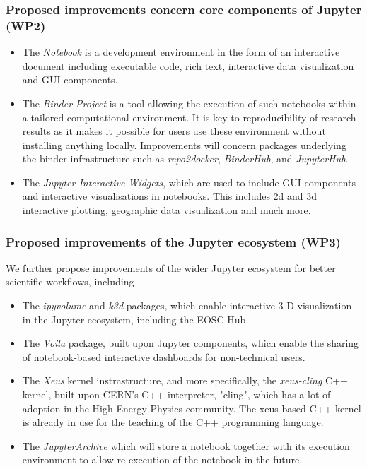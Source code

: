 \subsubsection{Proposed improvements concern core components of Jupyter (WP2)}

\begin{itemize}
\item The \emph{Notebook} is a development environment in the form of an
interactive document including executable code, rich text, interactive data
visualization and GUI components.
\item The \emph{Binder Project} is a tool allowing the execution of such
notebooks within a tailored computational environment. It is key to reproducibility
of research results as it makes it possible for
users use these environment without installing anything locally.
Improvements will concern packages underlying the binder infrastructure such
as \emph{repo2docker}, \emph{BinderHub}, and \emph{JupyterHub}.
\item The \emph{Jupyter Interactive Widgets}, which are used to include GUI
components and interactive visualisations in notebooks. This includes 2d
and 3d interactive plotting, geographic data visualization and much more.
\end{itemize}

\subsubsection{Proposed improvements of the Jupyter ecosystem (WP3)}

We further propose improvements of the wider Jupyter ecosystem for
better scientific workflows, including
\begin{itemize}
\item The \emph{ipyvolume} and \emph{k3d} packages, which enable interactive
3-D visualization in the Jupyter ecosystem, including the EOSC-Hub.
\item The \emph{Voila} package, built upon Jupyter components, which enable the
sharing of notebook-based interactive dashboards for non-technical users.
\item The \emph{Xeus} kernel instrastructure, and more specifically,
  the \emph{xeus-cling} C++ kernel, built upon CERN's C++ interpreter,
  "cling", which has a lot of adoption in the High-Energy-Physics
  community. The xeus-based C++ kernel is already in use for the
  teaching of the C++ programming language.
\item The \emph{JupyterArchive} which will store a notebook together
  with its execution environment to allow re-execution of the notebook
  in the future.
\end{itemize}

